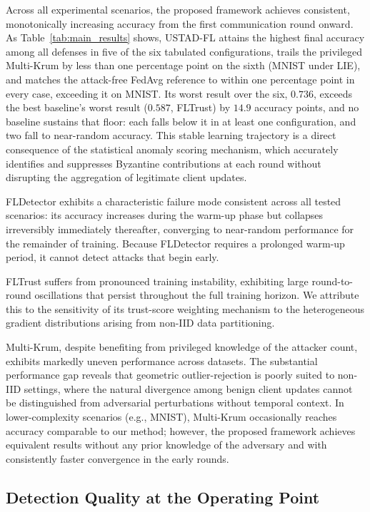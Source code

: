 \documentclass[journal]{IEEEtran}
\begin{document}
Across all experimental scenarios, the proposed framework achieves consistent, monotonically increasing accuracy from the first communication round onward. As Table~\ref{tab:main_results} shows, USTAD-FL attains the highest final accuracy among all defenses in five of the six tabulated configurations, trails the privileged Multi-Krum by less than one percentage point on the sixth (MNIST under LIE), and matches the attack-free FedAvg reference to within one percentage point in every case, exceeding it on MNIST. Its worst result over the six, $0.736$, exceeds the best baseline's worst result ($0.587$, FLTrust) by $14.9$ accuracy points, and no baseline sustains that floor: each falls below it in at least one configuration, and two fall to near-random accuracy. This stable learning trajectory is a direct consequence of the statistical anomaly scoring mechanism, which accurately identifies and suppresses Byzantine contributions at each round without disrupting the aggregation of legitimate client updates.


FLDetector exhibits a characteristic failure mode consistent across all tested scenarios: its accuracy increases during the warm-up phase but collapses irreversibly immediately thereafter, converging to near-random performance for the remainder of training. Because FLDetector requires a prolonged warm-up period, it cannot detect attacks that begin early.

FLTrust suffers from pronounced training instability, exhibiting large round-to-round oscillations that persist throughout the full training horizon. We attribute this to the sensitivity of its trust-score weighting mechanism to the heterogeneous gradient distributions arising from non-IID data partitioning.

Multi-Krum, despite benefiting from privileged knowledge of the attacker count, exhibits markedly uneven performance across datasets. The substantial performance gap reveals that geometric outlier-rejection is poorly suited to non-IID settings, where the natural divergence among benign client updates cannot be distinguished from adversarial perturbations without temporal context. In lower-complexity scenarios (e.g., MNIST), Multi-Krum occasionally reaches accuracy comparable to our method; however, the proposed framework achieves equivalent results without any prior knowledge of the adversary and with consistently faster convergence in the early rounds.



\subsection{Detection Quality at the Operating Point}
\label{sec:detection_quality}
\end{document}
